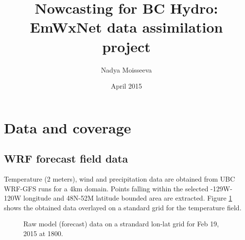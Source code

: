 \documentclass{article}
\begin{document}
\title{Nowcasting for BC Hydro: EmWxNet data assimilation project}
\author{Nadya Moisseeva}
\date{April 2015}    %

\maketitle

\tableofcontents

\newpage
\section{Data and coverage}
\subsection{WRF forecast field data}

Temperature (2 meters), wind and precipitation data are obtained from UBC WRF-GFS runs for a 4km domain. Points falling within the selected -129W-120W longitude and 48N-52M latitude bounded area are extracted. Figure \ref{T2raw} shows the obtained data overlayed on a standard grid for the temperature field. 
\begin{figure}
\makebox[\textwidth][c]{\includegraphics[width=20cm{../temp_raw.pdf}}
\caption{Raw model (forecast) data on a strandard lon-lat grid for Feb 19, 2015 at 1800.}\label{T2raw}
\end{figure}




% 
% 
\end{document}

